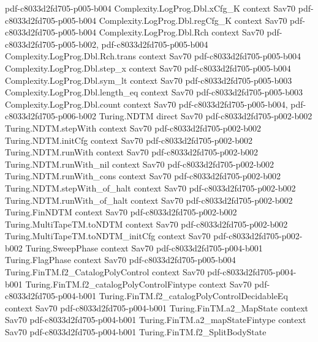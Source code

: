 \begin{theorem}
{    pdf-c8033d2fd705-p005-b004}
\proofstep
  {Complexity.LogProg.Dbl.xCfg_K}
  {context}
  {Sav70}
  {pdf-c8033d2fd705-p005-b004}
\proofstep
  {Complexity.LogProg.Dbl.regCfg_K}
  {context}
  {Sav70}
  {pdf-c8033d2fd705-p005-b004}
\proofstep
  {Complexity.LogProg.Dbl.Rch}
  {context}
  {Sav70}
  {pdf-c8033d2fd705-p005-b002,
    pdf-c8033d2fd705-p005-b004}
\proofstep
  {Complexity.LogProg.Dbl.Rch.trans}
  {context}
  {Sav70}
  {pdf-c8033d2fd705-p005-b004}
\proofstep
  {Complexity.LogProg.Dbl.step_x}
  {context}
  {Sav70}
  {pdf-c8033d2fd705-p005-b004}
\proofstep
  {Complexity.LogProg.Dbl.sym_lt}
  {context}
  {Sav70}
  {pdf-c8033d2fd705-p005-b003}
\proofstep
  {Complexity.LogProg.Dbl.length_eq}
  {context}
  {Sav70}
  {pdf-c8033d2fd705-p005-b003}
\proofstep
  {Complexity.LogProg.Dbl.count}
  {context}
  {Sav70}
  {pdf-c8033d2fd705-p005-b004,
    pdf-c8033d2fd705-p006-b002}
\proofstep
  {Turing.NDTM}
  {direct}
  {Sav70}
  {pdf-c8033d2fd705-p002-b002}
\proofstep
  {Turing.NDTM.stepWith}
  {context}
  {Sav70}
  {pdf-c8033d2fd705-p002-b002}
\proofstep
  {Turing.NDTM.initCfg}
  {context}
  {Sav70}
  {pdf-c8033d2fd705-p002-b002}
\proofstep
  {Turing.NDTM.runWith}
  {context}
  {Sav70}
  {pdf-c8033d2fd705-p002-b002}
\proofstep
  {Turing.NDTM.runWith_nil}
  {context}
  {Sav70}
  {pdf-c8033d2fd705-p002-b002}
\proofstep
  {Turing.NDTM.runWith_cons}
  {context}
  {Sav70}
  {pdf-c8033d2fd705-p002-b002}
\proofstep
  {Turing.NDTM.stepWith_of_halt}
  {context}
  {Sav70}
  {pdf-c8033d2fd705-p002-b002}
\proofstep
  {Turing.NDTM.runWith_of_halt}
  {context}
  {Sav70}
  {pdf-c8033d2fd705-p002-b002}
\proofstep
  {Turing.FinNDTM}
  {context}
  {Sav70}
  {pdf-c8033d2fd705-p002-b002}
\proofstep
  {Turing.MultiTapeTM.toNDTM}
  {context}
  {Sav70}
  {pdf-c8033d2fd705-p002-b002}
\proofstep
  {Turing.MultiTapeTM.toNDTM_initCfg}
  {context}
  {Sav70}
  {pdf-c8033d2fd705-p002-b002}
\proofstep
  {Turing.SweepPhase}
  {context}
  {Sav70}
  {pdf-c8033d2fd705-p004-b001}
\proofstep
  {Turing.FlagPhase}
  {context}
  {Sav70}
  {pdf-c8033d2fd705-p005-b004}
\proofstep
  {Turing.FinTM.f2_CatalogPolyControl}
  {context}
  {Sav70}
  {pdf-c8033d2fd705-p004-b001}
\proofstep
  {Turing.FinTM.f2_catalogPolyControlFintype}
  {context}
  {Sav70}
  {pdf-c8033d2fd705-p004-b001}
\proofstep
  {Turing.FinTM.f2_catalogPolyControlDecidableEq}
  {context}
  {Sav70}
  {pdf-c8033d2fd705-p004-b001}
\proofstep
  {Turing.FinTM.a2_MapState}
  {context}
  {Sav70}
  {pdf-c8033d2fd705-p004-b001}
\proofstep
  {Turing.FinTM.a2_mapStateFintype}
  {context}
  {Sav70}
  {pdf-c8033d2fd705-p004-b001}
\proofstep
  {Turing.FinTM.f2_SplitBodyState}

\end{theorem}
